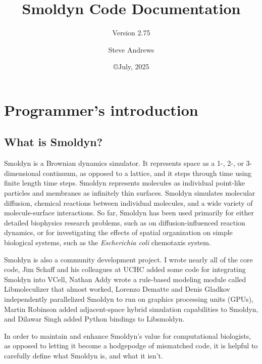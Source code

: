 \documentclass {scrbook}
\begin{document}

\title{Smoldyn Code Documentation} 
\subtitle{Version 2.75}
\date{\copyright July, 2025}
\author{Steve Andrews}
\maketitle

\tableofcontents


\chapter{Programmer's introduction}

\section{What is Smoldyn?}

Smoldyn is a Brownian dynamics simulator. It represents space as a 1-, 2-, or 3-dimensional continuum, as opposed to a lattice, and it steps through time using finite length time steps. Smoldyn represents molecules as individual point-like particles and membranes as infinitely thin surfaces. Smoldyn simulates molecular diffusion, chemical reactions between individual molecules, and a wide variety of molecule-surface interactions. So far, Smoldyn has been used primarily for either detailed biophysics research problems, such as on diffusion-influenced reaction dynamics, or for investigating the effects of spatial organization on simple biological systems, such as the \emph{Escherichia coli} chemotaxis system.

Smoldyn is also a community development project. I wrote nearly all of the core code, Jim Schaff and his colleagues at UCHC added some code for integrating Smoldyn into VCell, Nathan Addy wrote a rule-based modeling module called Libmoleculizer that almost worked, Lorenzo Dematte and Denis Gladkov independently parallelized Smoldyn to run on graphics processing units (GPUs), Martin Robinson added adjacent-space hybrid simulation capabilities to Smoldyn, and Dilawar Singh added Python bindings to Libsmoldyn.

In order to maintain and enhance Smoldyn's value for computational biologists, as opposed to letting it become a hodgepodge of mismatched code, it is helpful to carefully define what Smoldyn is, and what it isn't.
\end{document}
